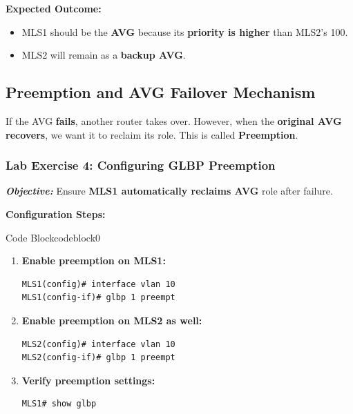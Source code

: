 \documentclass[a4paper]{book}
\begin{document}
\textbf{Expected Outcome:}
\begin{itemize}
\item MLS1 should be the \textbf{AVG} because its \textbf{priority is higher} than MLS2’s 100.
\item MLS2 will remain as a \textbf{backup AVG}.
\end{itemize}

\subsection{Preemption and AVG Failover Mechanism}
If the AVG \textbf{fails}, another router takes over. However, when the \textbf{original AVG recovers}, 
we want it to reclaim its role. This is called \textbf{Preemption}.

\subsubsection{Lab Exercise 4: Configuring GLBP Preemption}
\textbf{\textit{Objective:}} Ensure \textbf{MLS1 automatically reclaims AVG} role after failure.
\vspace{1.5em}

\textbf{Configuration Steps:}

\vspace{1.5em}


\begin{ocg}{Code Block}{codeblock}{0}

\vspace{0.5cm}

\begin{enumerate}
\item \textbf{Enable preemption on MLS1:}
\begin{lstlisting}
MLS1(config)# interface vlan 10
MLS1(config-if)# glbp 1 preempt
\end{lstlisting}

\item \textbf{Enable preemption on MLS2 as well:}
\begin{lstlisting}
MLS2(config)# interface vlan 10
MLS2(config-if)# glbp 1 preempt
\end{lstlisting}

\item \textbf{Verify preemption settings:}
\begin{lstlisting}
MLS1# show glbp
\end{lstlisting}
\end{enumerate}
\end{ocg}
\end{document}

